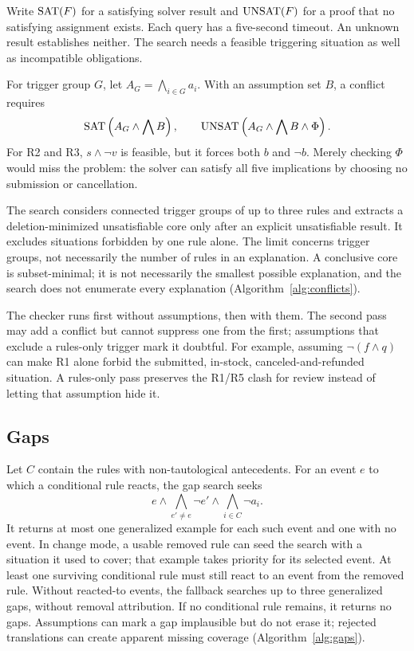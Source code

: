 Write $\operatorname{SAT}(F)$ for a satisfying solver result and $\operatorname{UNSAT}(F)$ for a proof that no satisfying assignment exists. Each query has a five-second timeout. An unknown result establishes neither. The search needs a feasible triggering situation as well as incompatible obligations.

For trigger group $G$, let $A_G=\bigwedge_{i\in G}a_i$. With an assumption set $B$, a conflict requires
\[
 \operatorname{SAT}\left(A_G\land\bigwedge B\right),\qquad
 \operatorname{UNSAT}\left(A_G\land\bigwedge B\land\Phi\right).
\]
For R2 and R3, $s\land\neg v$ is feasible, but it forces both $b$ and $\neg b$. Merely checking $\Phi$ would miss the problem: the solver can satisfy all five implications by choosing no submission or cancellation.

The search considers connected trigger groups of up to three rules and extracts a deletion-minimized unsatisfiable core only after an explicit unsatisfiable result. It excludes situations forbidden by one rule alone. The limit concerns trigger groups, not necessarily the number of rules in an explanation. A conclusive core is subset-minimal; it is not necessarily the smallest possible explanation, and the search does not enumerate every explanation (Algorithm~\ref{alg:conflicts}).

The checker runs first without assumptions, then with them. The second pass may add a conflict but cannot suppress one from the first; assumptions that exclude a rules-only trigger mark it doubtful. For example, assuming $\neg(f\land q)$ can make R1 alone forbid the submitted, in-stock, canceled-and-refunded situation. A rules-only pass preserves the R1/R5 clash for review instead of letting that assumption hide it.

\subsection{Gaps}
Let $C$ contain the rules with non-tautological antecedents. For an event $e$ to which a conditional rule reacts, the gap search seeks
\[
 e\land\bigwedge_{e'\ne e}\neg e'\land\bigwedge_{i\in C}\neg a_i.
\]
It returns at most one generalized example for each such event and one with no event. In change mode, a usable removed rule can seed the search with a situation it used to cover; that example takes priority for its selected event. At least one surviving conditional rule must still react to an event from the removed rule. Without reacted-to events, the fallback searches up to three generalized gaps, without removal attribution. If no conditional rule remains, it returns no gaps. Assumptions can mark a gap implausible but do not erase it; rejected translations can create apparent missing coverage (Algorithm~\ref{alg:gaps}).

